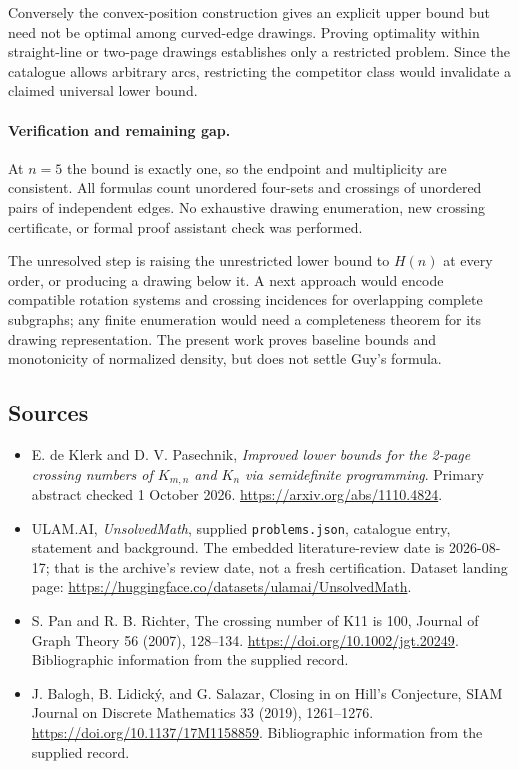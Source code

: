 \documentclass[11pt,a4paper]{article}
\begin{document}
Conversely the convex-position construction gives an explicit upper bound but need not be optimal among curved-edge drawings. Proving optimality within straight-line or two-page drawings establishes only a restricted problem. Since the catalogue allows arbitrary arcs, restricting the competitor class would invalidate a claimed universal lower bound.

\paragraph{Verification and remaining gap.}
At $n=5$ the bound is exactly one, so the endpoint and multiplicity are consistent. All formulas count unordered four-sets and crossings of unordered pairs of independent edges. No exhaustive drawing enumeration, new crossing certificate, or formal proof assistant check was performed.

The unresolved step is raising the unrestricted lower bound to $H(n)$ at every order, or producing a drawing below it. A next approach would encode compatible rotation systems and crossing incidences for overlapping complete subgraphs; any finite enumeration would need a completeness theorem for its drawing representation. The present work proves baseline bounds and monotonicity of normalized density, but does not settle Guy's formula.

\subsection{Sources}

{\small

\begin{itemize}
\item[E1] E. de Klerk and D. V. Pasechnik, \emph{Improved lower bounds for the 2-page crossing numbers of $K_{m,n}$ and $K_n$ via semidefinite programming}. Primary abstract checked 1 October 2026. \url{https://arxiv.org/abs/1110.4824}.


\item[\hypertarget{source:statement:1}{S1}] ULAM.AI, \emph{UnsolvedMath}, supplied \texttt{problems.json}, catalogue entry, statement and background. The embedded literature-review date is 2026-08-17; that is the archive’s review date, not a fresh certification. Dataset landing page: \url{https://huggingface.co/datasets/ulamai/UnsolvedMath}.

\item[\hypertarget{source:statement:2}{S2}] S. Pan and R. B. Richter, The crossing number of K11 is 100, Journal of Graph Theory 56 (2007), 128–134. \url{https://doi.org/10.1002/jgt.20249}. Bibliographic information from the supplied record.

\item[\hypertarget{source:statement:3}{S3}] J. Balogh, B. Lidický, and G. Salazar, Closing in on Hill's Conjecture, SIAM Journal on Discrete Mathematics 33 (2019), 1261–1276. \url{https://doi.org/10.1137/17M1158859}. Bibliographic information from the supplied record.

\end{itemize}

}

\label{end:statement}
\end{document}

